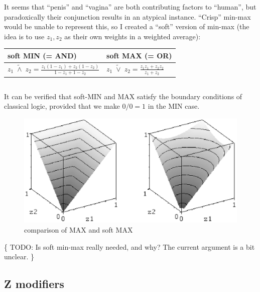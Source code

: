 It seems that ``penis'' and ``vagina'' are both contributing factors to ``human'', but paradoxically their conjunction results in an atypical instance.  ``Crisp'' min-max would be unable to represent this, so I created a ``soft'' version of min-max (the idea is to use $z_1, z_2$ as their own weights in a weighted average):


\hspace*{1cm} \begin{tabular}{|l|l|}
\hline
{\textbf{soft MIN (= AND)}} & {\textbf{soft MAX (= OR)}}\\ \hline
\rule[-7mm]{0mm}{16mm} 
$\displaystyle z_1 \; \widetilde{\wedge} \; z_2 = \frac{z_1 (1-z_1) + z_2 (1-z_2)}{1 - z_1 + 1 - z_2} $
& $\displaystyle z_1 \; \widetilde{\vee} \; z_2 = \frac{z_1 z_1 + z_2 z_2}{z_1 + z_2} $ \\
\hline
\end{tabular}
\parbox{4cm}{\begin{equation}
\label{eqn:soft-MIN-MAX}
\end{equation}}

It can be verified that soft-MIN and MAX satisfy the boundary conditions of classical logic, provided that we make $0/0 = 1$ in the MIN case.

\begin{figure}[H]
\centering
\includegraphics[scale=0.7]{soft-max.eps}
\caption{comparison of MAX and soft MAX}
\end{figure}

\{ TODO:  Is soft min-max really needed, and why?  The current argument is a bit unclear. \}

\subsection{Z modifiers}

